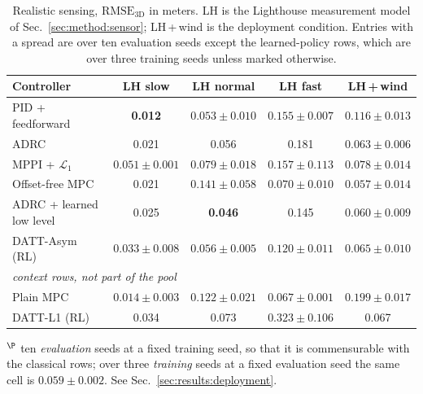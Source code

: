 \begin{table}[t]
\caption{Realistic sensing, $\mathrm{RMSE}_{\mathrm{3D}}$ in meters. LH is the
Lighthouse measurement model of Sec.~\ref{sec:method:sensor}; LH\,+\,wind is the
deployment condition. Entries with a spread are over ten evaluation seeds except the
learned-policy rows, which are over three training seeds unless marked otherwise.}
\label{tab:sensing}
\begin{center}\small
\begin{tabular}{lcccc}
\toprule
Controller & LH slow & LH normal & LH fast & LH\,+\,wind \\
\midrule
PID + feedforward        & \textbf{0.012} & $0.053\pm0.010$ & $0.155\pm0.007$ & $0.116\pm0.013$ \\
ADRC                     & 0.021 & 0.056 & 0.181 & $0.063\pm0.006$ \\
MPPI + $\mathcal{L}_1$   & $0.051\pm0.001$ & $0.079\pm0.018$ & $0.157\pm0.113$ & $0.078\pm0.014$ \\
Offset-free MPC          & 0.021 & $0.141\pm0.058$ & $0.070\pm0.010$ & $\mathbf{0.057\pm0.014}$ \\
ADRC + learned low level & 0.025 & \textbf{0.046} & 0.145 & $0.060\pm0.009$ \\
DATT-Asym (RL)           & $0.033\pm0.008$ & $0.056\pm0.005$ & $\mathbf{0.120\pm0.011}$ & $0.065\pm0.010$\rlap{$^{\P}$} \\
\midrule
\multicolumn{5}{l}{\emph{context rows, not part of the pool}} \\
Plain MPC                & $0.014\pm0.003$ & $0.122\pm0.021$ & $0.067\pm0.001$ & $0.199\pm0.017$ \\
DATT-L1 (RL)             & 0.034 & 0.073 & $0.323\pm0.106$ & 0.067 \\
\bottomrule
\end{tabular}
\end{center}
{\footnotesize $^{\P}$ ten \emph{evaluation} seeds at a fixed training seed, so that it
is commensurable with the classical rows; over three \emph{training} seeds at a fixed
evaluation seed the same cell is $0.059\pm0.002$. See
Sec.~\ref{sec:results:deployment}.\par}
\end{table}

